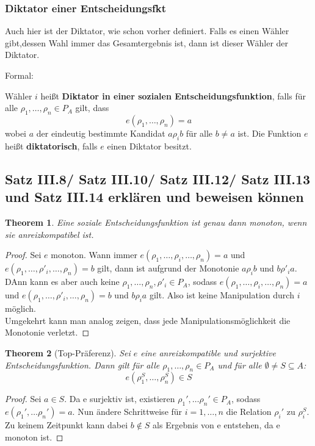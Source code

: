 \documentclass[]{article}
\newtheorem{thm}{Theorem}
\begin{document}
\subsubsection*{Diktator einer Entscheidungsfkt}
Auch hier ist der Diktator, wie schon vorher definiert. Falls es einen Wähler gibt,dessen Wahl immer das Gesamtergebnis ist, dann ist dieser Wähler der Diktator.

Formal:  

Wähler $i$ heißt \textbf{Diktator in einer sozialen Entscheidungsfunktion}, falls für alle $\rho_1, \dots, \rho_n \in P_A$ gilt, dass
\begin{equation*}
e(\rho_1,\dots, \rho_n) = a
\end{equation*}
wobei $a$ der eindeutig bestimmte Kandidat $a \rho_i b$ für alle $b \neq a$ ist. Die Funktion $e$ heißt \textbf{diktatorisch}, falls $e$ einen Diktator besitzt.

\subsection*{Satz III.8/ Satz III.10/ Satz III.12/ Satz III.13 und Satz III.14 erklären und beweisen können} 

\begin{thm}
		Eine soziale Entscheidungsfunktion ist genau dann monoton, wenn sie anreizkompatibel ist.
\end{thm}
\begin{proof}
	Sei $e$ monoton. Wann immer $e(\rho_1, \dots, \rho_i, \dots, \rho_n) = a$ und $e(\rho_1, \dots, \rho'_i, \dots, \rho_n) = b$ gilt,
	dann ist aufgrund der Monotonie $a \rho_i b $ und $ b \rho'_i a$. DAnn kann es aber auch keine $\rho_1, \dots, \rho_n, \rho'_i \in P_A$,
	sodass $e(\rho_1, \dots, \rho_i, \dots, \rho_n) = a$ und $e(\rho_1, \dots, \rho'_i, \dots, \rho_n) = b$ und $b \rho_i a$ gilt. Also ist keine Manipulation durch $i$ möglich. \\
	Umgekehrt kann man analog zeigen, dass jede Manipulationsmöglichkeit die Monotonie verletzt.
\end{proof}

\begin{thm}[Top-Präferenz] \label{Top_Praeferenz_Lemma}
	Sei $e$ eine anreizkompatible und surjektive Entscheidungsfunktion. Dann gilt für alle $\rho_1, \dots, \rho_n \in P_A$ und für alle $\emptyset \neq S \subseteq A$:
	\[ e(\rho_1^S, \dots, \rho^S_n) \in S \]
\end{thm}
\begin{proof}
	Sei $a \in S$. Da e surjektiv ist, existieren $\rho_1', \dots \rho_n' \in P_A$, sodass $e(\rho_1', \dots \rho_n')=a$. Nun ändere Schrittweise für $i=1, \dots, n $ die Relation $\rho_i'$ zu $\rho_i^S$. Zu keinem Zeitpunkt kann dabei $b \notin S$ als Ergebnis von e entstehen, da e monoton ist.  
\end{proof}
\end{document}
